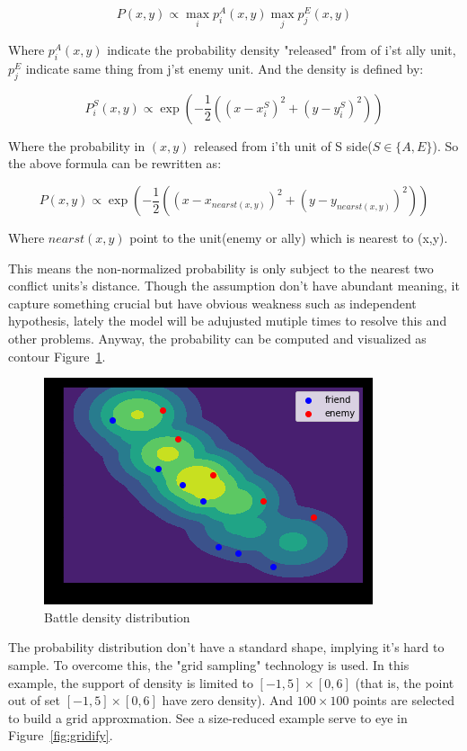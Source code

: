\documentclass{article}
\begin{document}
$$
P(x,y) \propto \max_i p^A_{i}(x,y) \max_j p^E_{j} (x,y)
$$

Where $p^A_{i}(x,y)$ indicate the probability density "released" from of i’st ally unit,
$p^E_{j}$ indicate same thing from j’st enemy unit. And the density is defined by:

$$
P^S_i(x,y) \propto \exp(-\frac{1}{2}((x-x^S_i)^2 + (y-y^S_i)^2))
$$

Where the probability in $(x,y)$ released from i'th unit of S side($S \in \{A,E \}$). 
So the above formula can be rewritten as: 

$$
P(x,y) \propto \exp(-\frac{1}{2}((x-x_{nearst(x,y)})^2 + (y-y_{nearst(x,y)})^2))
$$

Where $nearst(x,y)$ point to the unit(enemy or ally) which is nearest to (x,y).

This means the non-normalized probability is only subject to the nearest two conflict units’s distance. 
Though the assumption don’t have abundant meaning,
it capture something crucial but have obvious weakness such as independent hypothesis, 
lately the model will be adujusted mutiple times to resolve this and other problems. 
Anyway, the probability can be computed and visualized as contour Figure~\ref{fig:stateNoBattleProb}.

\begin{figure}[h]
\includegraphics{state_no_battle_prob.png}
\caption{Battle density distribution}
\label{fig:stateNoBattleProb}
\end{figure}

The probability distribution don't have a standard shape, implying it's hard to sample. 
To overcome this, the "grid sampling" technology is used. In this example,
 the support of density is limited to $[-1,5] \times [0,6]$
(that is, the point out of set $[-1,5] \times [0,6]$ have zero density). 
And $100 \times 100$ points are selected to build a grid approxmation. 
See a size-reduced example serve to eye in Figure~\ref{fig:gridify}.
\end{document}
